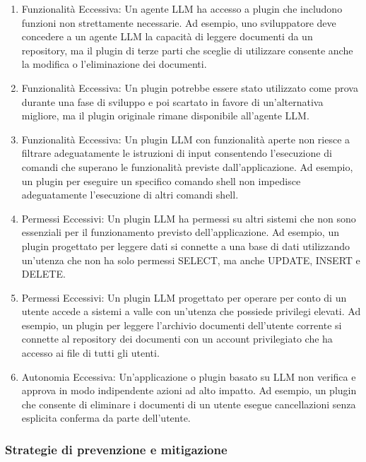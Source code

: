 \documentclass[
]{article}
\providecommand{\tightlist}{%
  \setlength{\itemsep}{0pt}\setlength{\parskip}{0pt}}
\begin{document}
\begin{enumerate}
\def\labelenumi{\arabic{enumi}.}
\tightlist
\item
  Funzionalità Eccessiva: Un agente LLM ha accesso a plugin che
  includono funzioni non strettamente necessarie. Ad esempio, uno
  sviluppatore deve concedere a un agente LLM la capacità di leggere
  documenti da un repository, ma il plugin di terze parti che sceglie di
  utilizzare consente anche la modifica o l'eliminazione dei documenti.
\item
  Funzionalità Eccessiva: Un plugin potrebbe essere stato utilizzato
  come prova durante una fase di sviluppo e poi scartato in favore di
  un'alternativa migliore, ma il plugin originale rimane disponibile
  all'agente LLM.
\item
  Funzionalità Eccessiva: Un plugin LLM con funzionalità aperte non
  riesce a filtrare adeguatamente le istruzioni di input consentendo
  l'esecuzione di comandi che superano le funzionalità previste
  dall'applicazione. Ad esempio, un plugin per eseguire un specifico
  comando shell non impedisce adeguatamente l'esecuzione di altri
  comandi shell.
\item
  Permessi Eccessivi: Un plugin LLM ha permessi su altri sistemi che non
  sono essenziali per il funzionamento previsto dell'applicazione. Ad
  esempio, un plugin progettato per leggere dati si connette a una base
  di dati utilizzando un'utenza che non ha solo permessi SELECT, ma
  anche UPDATE, INSERT e DELETE.
\item
  Permessi Eccessivi: Un plugin LLM progettato per operare per conto di
  un utente accede a sistemi a valle con un'utenza che possiede
  privilegi elevati. Ad esempio, un plugin per leggere l'archivio
  documenti dell'utente corrente si connette al repository dei documenti
  con un account privilegiato che ha accesso ai file di tutti gli
  utenti.
\item
  Autonomia Eccessiva: Un'applicazione o plugin basato su LLM non
  verifica e approva in modo indipendente azioni ad alto impatto. Ad
  esempio, un plugin che consente di eliminare i documenti di un utente
  esegue cancellazioni senza esplicita conferma da parte dell'utente.
\end{enumerate}

\subsubsection{Strategie di prevenzione e
mitigazione}\label{strategie-di-prevenzione-e-mitigazione}
\end{document}
